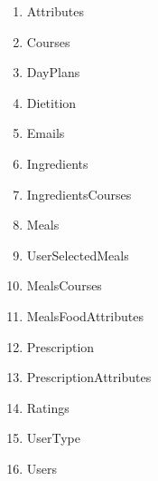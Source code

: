 \begin{enumerate}
\item Attributes
\item Courses
\item DayPlans
\item Dietition
\item Emails
\item Ingredients
\item IngredientsCourses
\item Meals
\item UserSelectedMeals
\item MealsCourses
\item MealsFoodAttributes
\item Prescription
\item PrescriptionAttributes
\item Ratings
\item UserType
\item Users
\end{enumerate}
